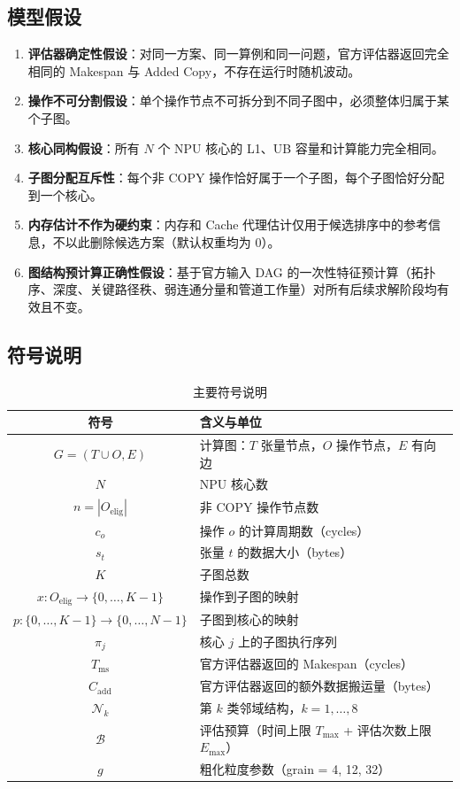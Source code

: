 \documentclass[bwprint]{gmcmthesis}
\begin{document}
\subsection{模型假设}

\begin{enumerate}
  \item \textbf{评估器确定性假设}：对同一方案、同一算例和同一问题，官方评估器返回完全相同的 Makespan 与 Added Copy，不存在运行时随机波动。
  \item \textbf{操作不可分割假设}：单个操作节点不可拆分到不同子图中，必须整体归属于某个子图。
  \item \textbf{核心同构假设}：所有 $N$ 个 NPU 核心的 L1、UB 容量和计算能力完全相同。
  \item \textbf{子图分配互斥性}：每个非 COPY 操作恰好属于一个子图，每个子图恰好分配到一个核心。
  \item \textbf{内存估计不作为硬约束}：内存和 Cache 代理估计仅用于候选排序中的参考信息，不以此删除候选方案（默认权重均为 0）。
  \item \textbf{图结构预计算正确性假设}：基于官方输入 DAG 的一次性特征预计算（拓扑序、深度、关键路径秩、弱连通分量和管道工作量）对所有后续求解阶段均有效且不变。
\end{enumerate}

\subsection{符号说明}

\renewcommand{\arraystretch}{1.2}
\begin{table}[!h]
\centering
\caption{主要符号说明}
\label{tab:symbols}
\small
\begin{tabular}{c l}
\toprule
\textbf{符号} & \textbf{含义与单位} \\
\midrule
$G = (T \cup O, E)$ & 计算图：$T$ 张量节点，$O$ 操作节点，$E$ 有向边 \\
$N$               & NPU 核心数 \\
$n = |O_{\text{elig}}|$ & 非 COPY 操作节点数 \\
$c_o$             & 操作 $o$ 的计算周期数（cycles） \\
$s_t$             & 张量 $t$ 的数据大小（bytes） \\
$K$               & 子图总数 \\
$x: O_{\text{elig}} \to \{0,\dots,K-1\}$ & 操作到子图的映射 \\
$p: \{0,\dots,K-1\} \to \{0,\dots,N-1\}$ & 子图到核心的映射 \\
$\pi_j$           & 核心 $j$ 上的子图执行序列 \\
$T_{\text{ms}}$   & 官方评估器返回的 Makespan（cycles） \\
$C_{\text{add}}$  & 官方评估器返回的额外数据搬运量（bytes） \\
$\mathcal{N}_k$   & 第 $k$ 类邻域结构，$k = 1,\dots,8$ \\
$\mathcal{B}$     & 评估预算（时间上限 $T_{\max}$ + 评估次数上限 $E_{\max}$） \\
$g$               & 粗化粒度参数（grain = 4, 12, 32） \\
\bottomrule
\end{tabular}
\end{table}
\end{document}
